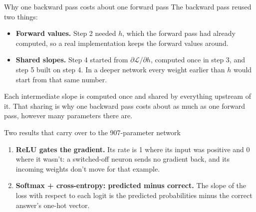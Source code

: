 \documentclass[aspectratio=169,11pt,t,\primeropts]{beamer}
\begin{document}
\begin{frame}{Why one backward pass costs about one forward pass}
  The backward pass reused two things:
  \begin{itemize}
    \item \textbf{Forward values.} Step 2 needed $h$, which the forward pass had already
      computed, so a real implementation keeps the forward values around.
    \item \textbf{Shared slopes.} Step 4 started from $\partial\mathcal{L}/\partial h$, computed
      once in step 3, and step 5 built on step 4. In a deeper network every weight earlier than
      $h$ would start from that same number.
  \end{itemize}
  \vspace{2mm}
  \begin{keyidea}
    Each intermediate slope is computed once and shared by everything upstream of it. That
    sharing is why one backward pass costs about as much as one forward pass, however many
    parameters there are.
  \end{keyidea}
\end{frame}

\begin{frame}{Two results that carry over to the 907-parameter network}
  \begin{enumerate}
    \item \textbf{ReLU gates the gradient.} Its rate is 1 where its input was positive and 0
      where it wasn't: a switched-off neuron sends no gradient back, and its incoming weights
      don't move for that example.
    \item<2-> \textbf{Softmax + cross-entropy: predicted minus correct.} The slope of the loss
      with respect to each logit is the predicted probabilities minus the correct answer's
      one-hot vector.
  \end{enumerate}
\end{frame}
\end{document}
